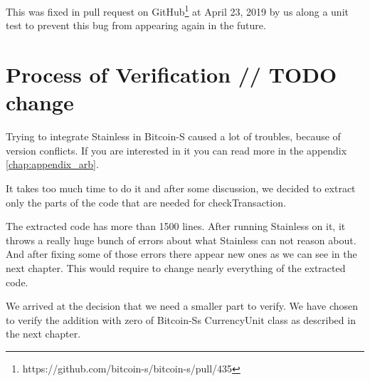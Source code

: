 This was fixed in pull request  on GitHub\footnote{https://github.com/bitcoin-s/bitcoin-s/pull/435} at April 23, 2019 by us along a unit test to prevent this bug from appearing again in the future.


\section{Process of Verification // TODO change}

Trying to integrate Stainless in Bitcoin-S caused a lot of troubles, because of version conflicts.
If you are interested in it you can read more in the appendix \ref{chap:appendix_arb}.

It takes too much time to do it and after some discussion, we decided to extract only the parts of the code that are needed for checkTransaction.

The extracted code has more than 1500 lines.
After running Stainless on it, it throws a really huge bunch of errors about what Stainless can not reason about.
And after fixing some of those errors there appear new ones as we can see in the next chapter.
This would require to change nearly everything of the extracted code.

We arrived at the decision that we need a smaller part to verify.
We have chosen to verify the addition with zero of Bitcoin-Ss CurrencyUnit class as described in the next chapter.
